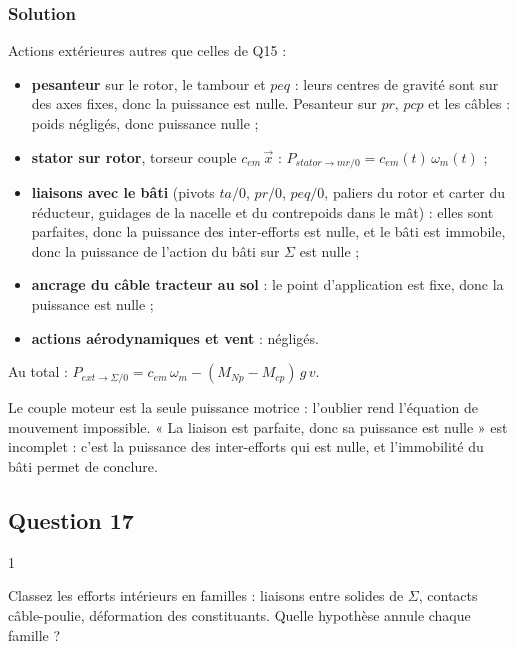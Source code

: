 \documentclass[11pt,a4paper]{article}
\providecommand{\tightlist}{\setlength{\itemsep}{0pt}\setlength{\parskip}{0pt}}
\begin{document}
\hypertarget{solution-15}{%
\subsubsection{Solution}\label{solution-15}}

Actions extérieures autres que celles de Q15 :

\begin{itemize}
\tightlist
\item
  \textbf{pesanteur} sur le rotor, le tambour et \(peq\) : leurs centres de gravité sont sur des axes fixes, donc la puissance est nulle. Pesanteur sur \(pr\), \(pcp\) et les câbles : poids négligés, donc puissance nulle ;
\item
  \textbf{stator sur rotor}, torseur couple \(c_{em}\,\vec x\) : \(\boxed{P_{stator\to mr/0}=c_{em}(t)\,\omega_m(t)}\) ;
\item
  \textbf{liaisons avec le bâti} (pivots \(ta/0\), \(pr/0\), \(peq/0\), paliers du rotor et carter du réducteur, guidages de la nacelle et du contrepoids dans le mât) : elles sont parfaites, donc la puissance des inter-efforts est nulle, et le bâti est immobile, donc la puissance de l'action du bâti sur \(\Sigma\) est nulle ;
\item
  \textbf{ancrage du câble tracteur au sol} : le point d'application est fixe, donc la puissance est nulle ;
\item
  \textbf{actions aérodynamiques et vent} : négligés.
\end{itemize}

Au total : \(P_{ext\to\Sigma/0}=c_{em}\,\omega_m-(M_{Np}-M_{cp})\,g\,v\).

\begin{piege}

Le couple moteur est la seule puissance motrice : l'oublier rend l'équation de mouvement impossible. « La liaison est parfaite, donc sa puissance est nulle » est incomplet : c'est la puissance des inter-efforts qui est nulle, et l'immobilité du bâti permet de conclure.

\end{piege}

\hypertarget{question-17}{%
\subsection{Question 17}\label{question-17}}

\begin{indication}{1}

Classez les efforts intérieurs en familles : liaisons entre solides de \(\Sigma\), contacts câble-poulie, déformation des constituants. Quelle hypothèse annule chaque famille ?

\end{indication}
\end{document}
